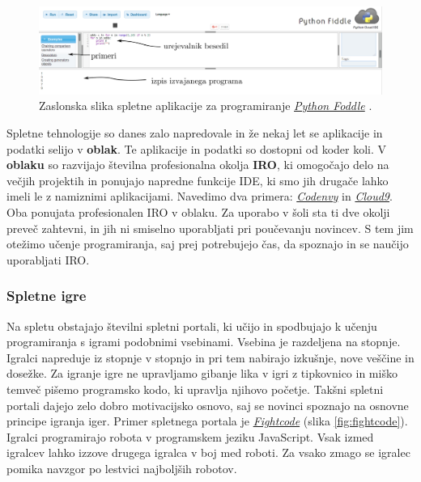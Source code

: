 \begin{figure}[h!]
    \includegraphics [width=1\linewidth, keepaspectratio =
    1] {./images/sc_web/PythonFiddle_01.jpg}
    \caption{Zaslonska slika spletne aplikacije za programiranje
      \emph{\href{http://pythonfiddle.com/}{Python Foddle}}
      \cite{web:pythonfiddle}.}
    \label{fig:scr:web:PyFiddle}
\end{figure}

Spletne tehnologije so danes zalo napredovale in že nekaj let se
aplikacije in podatki selijo v \textbf{oblak}. Te aplikacije in
podatki so dostopni od koder koli. V \textbf{oblaku} so razvijajo
številna profesionalna okolja \textbf{IRO}, ki omogočajo delo na
večjih projektih in ponujajo napredne funkcije IDE, ki smo jih drugače
lahko imeli le z namiznimi aplikacijami. Navedimo dva primera:
\emph{\href{https://codenvy.com/}{Codenvy}} \cite{web:codeenvy} in
\emph{\href{https://c9.io/}{Cloud9}}\cite{web:cloud9}. Oba ponujata
profesionalen IRO v oblaku. Za uporabo v šoli sta ti dve okolji preveč
zahtevni, in jih ni smiselno uporabljati pri poučevanju novincev. S
tem jim otežimo učenje programiranja, saj prej potrebujejo čas, da
spoznajo in se naučijo uporabljati IRO.

\subsubsection{Spletne igre}
\label{sec:spletne_igre}

Na spletu obstajajo številni spletni portali, ki učijo in spodbujajo k
učenju programiranja s igrami podobnimi vsebinami. Vsebina je
razdeljena na stopnje. Igralci napreduje iz stopnje v stopnjo in pri
tem nabirajo izkušnje, nove veščine in dosežke. Za igranje igre ne
upravljamo gibanje lika v igri z tipkovnico in miško temveč pišemo
programsko kodo, ki upravlja njihovo početje. Takšni spletni portali
dajejo zelo dobro motivacijsko osnovo, saj se novinci spoznajo na
osnovne principe igranja iger. Primer spletnega portala je
\emph{\href{http://fightcodegame.com/}{Fightcode}}
\cite{web:fightcode} (slika \ref{fig:fightcode}). Igralci programirajo robota v programskem jeziku
JavaScript. Vsak izmed igralcev lahko izzove drugega igralca v boj med
roboti. Za vsako zmago se igralec pomika navzgor po lestvici
najboljših robotov.

